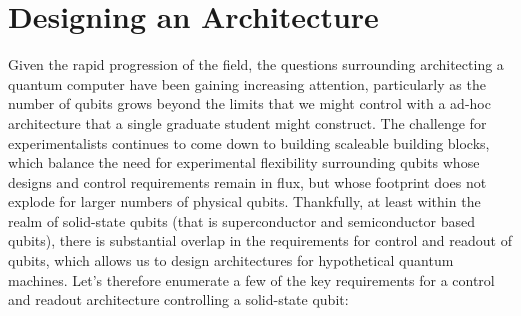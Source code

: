 \section{Designing an Architecture}
Given the rapid progression of the field, the questions surrounding architecting a quantum computer have been gaining increasing attention,
particularly as the number of qubits grows beyond the limits that we might control with a ad-hoc architecture that a single graduate student might construct.
The challenge for experimentalists continues to come down to building scaleable building blocks, which balance the need for experimental
flexibility surrounding qubits whose designs and control requirements remain in flux, but whose footprint does not explode for larger numbers
of physical qubits. Thankfully, at least within the realm of solid-state qubits (that is superconductor and semiconductor based qubits),
there is substantial overlap in the requirements for control and readout of qubits, which allows us to design architectures for hypothetical
quantum machines. Let's therefore enumerate a few of the key requirements for a control and readout architecture controlling a solid-state qubit:
